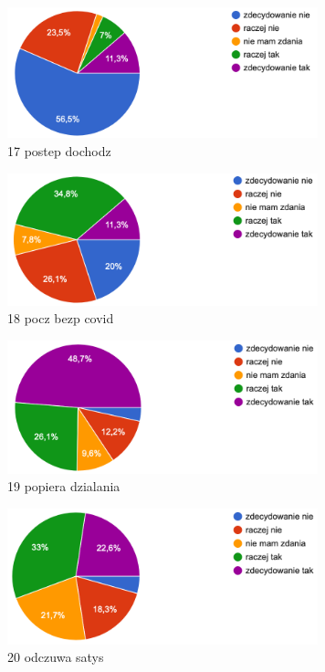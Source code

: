 \documentclass[a4paper,12pt,twoside,openany]{report}
\begin{document}
\begin{figure}
    \includegraphics[width=9cm]{wyniki/17_postep_dochodz}
    \caption{ 17 postep dochodz }
\end{figure}

\begin{figure}
    \includegraphics[width=9cm]{wyniki/18_pocz_bezp_covid}
    \caption{ 18 pocz bezp covid }
\end{figure}

\begin{figure}
    \includegraphics[width=9cm]{wyniki/19_popiera_dzialania}
    \caption{ 19 popiera dzialania }
\end{figure}

\begin{figure}
    \includegraphics[width=9cm]{wyniki/20_odczuwa_satys}
    \caption{ 20 odczuwa satys }
\end{figure}
\end{document}
